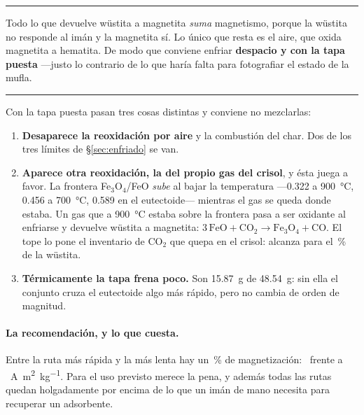 \documentclass[11pt,a4paper]{article}
\newenvironment{clave}
  {\par\medskip\noindent\rule{\linewidth}{0.9pt}\par\nobreak\smallskip
   \noindent\ignorespaces}
  {\par\smallskip\noindent\rule{\linewidth}{0.9pt}\par\medskip}
\begin{document}
\begin{clave}
Todo lo que devuelve wüstita a magnetita \emph{suma} magnetismo, porque la
wüstita no responde al imán y la magnetita sí. Lo único que resta es el aire,
que oxida magnetita a hematita. De modo que conviene enfriar \textbf{despacio y
con la tapa puesta} ---justo lo contrario de lo que haría falta para fotografiar
el estado de la mufla.
\end{clave}

\noindent
Con la tapa puesta pasan tres cosas distintas y conviene no mezclarlas:

\begin{enumerate}[leftmargin=*,itemsep=2pt]
\item \textbf{Desaparece la reoxidación por aire} y la combustión del char. Dos
de los tres límites de \S\ref{sec:enfriado} se van.
\item \textbf{Aparece otra reoxidación, la del propio gas del crisol}, y ésta
juega a favor. La frontera Fe$_3$O$_4$/FeO \emph{sube} al bajar la temperatura
---\num{0.322} a \SI{900}{\celsius}, \num{0.456} a \SI{700}{\celsius},
\num{0.589} en el eutectoide--- mientras el gas se queda donde estaba. Un gas
que a \SI{900}{\celsius} estaba sobre la frontera pasa a ser oxidante al
enfriarse y devuelve wüstita a magnetita:
$3\,\mathrm{FeO} + \mathrm{CO_2} \rightarrow \mathrm{Fe_3O_4} + \mathrm{CO}$.
El tope lo pone el inventario de CO$_2$ que quepa en el crisol: alcanza para el
\datReoxidaGas\,\% de la wüstita.
\item \textbf{Térmicamente la tapa frena poco.} Son \qty{15.87}{\gram} de
\qty{48.54}{\gram}: sin ella el conjunto cruza el eutectoide algo más rápido,
pero no cambia de orden de magnitud.
\end{enumerate}

\begin{table}[H]
\centering\small

\caption{Las cuatro rutas de enfriado, ordenadas por lo magnético que dejan el
producto. «Ventana» es el tiempo dentro de 570--\SI{400}{\celsius}, donde el
eutectoide puede operar; «eutect.» es la fracción de wüstita que alcanza a
descomponerse. La última columna es la magnetización relativa a la ruta más
rápida.}
\label{tab:rutas}
\end{table}

\paragraph{La recomendación, y lo que cuesta.} Entre la ruta más rápida y la más
lenta hay un \datMagnetGananciaRuta\,\% de magnetización:
\datMagnetPeorRuta\ frente a \datMagnetMejorRuta\
\si{\ampere\meter\squared\per\kilo\gram}. Para el uso previsto merece la pena, y
además todas las rutas quedan holgadamente por encima de lo que un imán de mano
necesita para recuperar un adsorbente.
\end{document}
